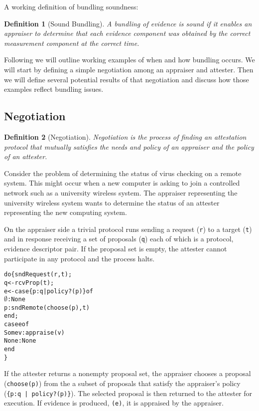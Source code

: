 \documentclass[10pt]{article}
\newtheorem{definition}{Definition}
\begin{document}
A working definition of bundling soundness:

\begin{definition}[Sound Bundling]
  A bundling of evidence is sound if it enables an appraiser to
  determine that each evidence component was obtained by the correct
  measurement component at the correct time.
\end{definition}

Following we will outline working examples of when and how bundling
occurs.  We will start by defining a simple negotiation among an
appraiser and attester.  Then we will define several
potential results of that negotiation and discuss how those examples
reflect bundling issues.

\subsection*{Negotiation}

\begin{definition}[Negotiation]
  Negotiation is the process of finding an attestation protocol that
  mutually satisfies the needs and policy of an appraiser and the
  policy of an attester.
\end{definition}

Consider the problem of determining the status of virus checking on a
remote system.  This might occur when a new computer is asking to join
a controlled network such as a university wireless system.  The
appraiser representing the university wireless system wants to
determine the status of an attester representing the new
computing system.

On the appraiser side a trivial protocol runs sending a request
(\Verb+r+) to a target (\Verb+t+) and in response receiving a set of
proposals (\Verb+q+) each of which is a protocol, evidence descriptor
pair.  If the proposal set is empty, the attester cannot participate
in any protocol and the process halts.


\begin{alltt}
  do \{ sndRequest(r,t);
       q <- rcvProp(t);
       e <- case \{p:q | policy?(p)\} of
              \(\emptyset\) : None
              p : sndRemote(choose(p),t)
            end;
       case e of 
         Some v : appraise(v)
         None : None
       end
  \}
\end{alltt}

If the attester returns a nonempty proposal set, the appraiser chooses
a proposal (\Verb+choose(p)+) from the a subset of proposals that
satisfy the appraiser's policy (\Verb+{p:q | policy?(p)}+).  The
selected proposal is then returned to the attester for execution.  If
evidence is produced, \Verb+(e)+, it is appraised by the appraiser.
\end{document}

